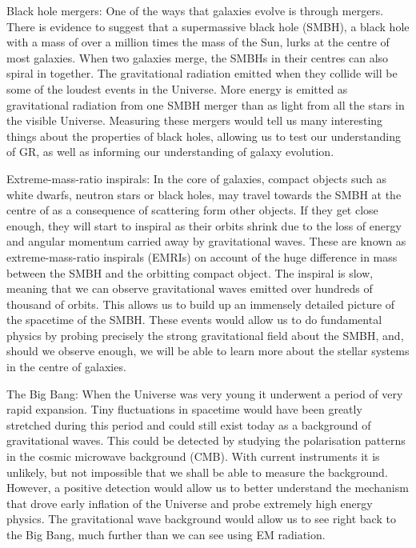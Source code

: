 Black hole mergers: One of the ways that galaxies evolve is through mergers. There is evidence to suggest that a supermassive black hole (SMBH), a black hole with a mass of over a million times the mass of the Sun, lurks at the centre of most galaxies. When two galaxies merge, the SMBHs in their centres can also spiral in together. The gravitational radiation emitted when they collide will be some of the loudest events in the Universe. More energy is emitted as gravitational radiation from one SMBH merger than as light from all the stars in the visible Universe. Measuring these mergers would tell us many interesting things about the properties of black holes, allowing us to test our understanding of GR, as well as informing our understanding of galaxy evolution.

Extreme-mass-ratio inspirals: In the core of galaxies, compact objects such as white dwarfs, neutron stars or black holes, may travel towards the SMBH at the centre of as a consequence of scattering form other objects. If they get close enough, they will start to inspiral as their orbits shrink due to the loss of energy and angular momentum carried away by gravitational waves. These are known as extreme-mass-ratio inspirals (EMRIs) on account of the huge difference in mass between the SMBH and the orbitting compact object. The inspiral is slow, meaning that we can observe gravitational waves emitted over hundreds of thousand of orbits. This allows us to build up an immensely detailed picture of the spacetime of the SMBH. These events would allow us to do fundamental physics by probing precisely the strong gravitational field about the SMBH, and, should we observe enough, we will be able to learn more about the stellar systems in the centre of galaxies.

The Big Bang: When the Universe was very young it underwent a period of very rapid expansion. Tiny fluctuations in spacetime would have been greatly stretched during this period and could still exist today as a background of gravitational waves. This could be detected by studying the polarisation patterns in the cosmic microwave background (CMB). With current instruments it is unlikely, but not impossible that we shall be able to measure the background. However, a positive detection would allow us to better understand the mechanism that drove early inflation of the Universe and probe extremely high energy physics. The gravitational wave background would allow us to see right back to the Big Bang, much further than we can see using EM radiation.

